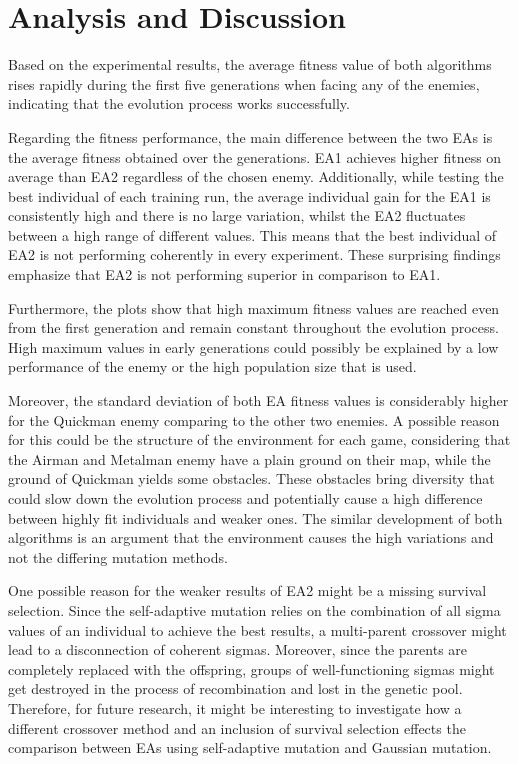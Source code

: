 \section{Analysis and Discussion}

Based on the experimental results, the average fitness value of both algorithms rises rapidly during the first five generations when facing any of the enemies, indicating that the evolution process works successfully.\par

Regarding the fitness performance, the main difference between the two EAs is the average fitness obtained over the generations. EA1 achieves higher fitness on average than EA2 regardless of the chosen enemy. Additionally, while testing the best individual of each training run, the average individual gain for the EA1 is consistently high and there is no large variation, whilst the EA2 fluctuates between a high range of different values. This means that the best individual of EA2 is not performing coherently in every experiment. These surprising findings emphasize that EA2 is not performing superior in comparison to EA1.\par

Furthermore, the plots show that high maximum fitness values are reached even from the first generation and remain constant throughout the evolution process. High maximum values in early generations could possibly be explained by a low performance of the enemy or the high population size that is used.\par

Moreover, the standard deviation of both EA fitness values is considerably higher for the Quickman enemy comparing to the other two enemies. A possible reason for this could be the structure of the environment for each game, considering that the Airman and Metalman enemy have a plain ground on their map, while the ground of Quickman yields some obstacles. These obstacles bring diversity that could slow down the evolution process and potentially cause a high difference between highly fit individuals and weaker ones. The similar development of both algorithms is an argument that the environment causes the high variations and not the differing mutation methods.\par

One possible reason for the weaker results of EA2 might be a missing survival selection. Since the self-adaptive mutation relies on the combination of all sigma values of an individual to achieve the best results, a multi-parent crossover might lead to a disconnection of coherent sigmas. Moreover, since the parents are completely replaced with the offspring, groups of well-functioning sigmas might get destroyed in the process of recombination and lost in the genetic pool. Therefore, for future research, it might be interesting to investigate how a different crossover method and an inclusion of survival selection effects the comparison between EAs using self-adaptive mutation and Gaussian mutation.\par


